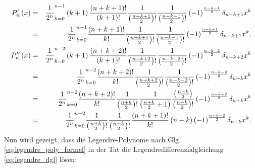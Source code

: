 \documentclass{book}
\let\sum\relax
\DeclareMathOperator*{\sum}{\raisebox{-3.5pt}{\scalebox{2}{\rotatebox{1}{{\bask Σ}}}}}
\begin{document}
\begin{eqnarray}
P_n'\left(x\right) & = & \frac{1}{2^n}\sum_{k = 0}^{n - 1}\left(k + 1\right)\frac{\left(n + k + 1\right)!}{\left(k + 1\right)!}\frac{1}{\left(\frac{n + k + 1}{2}\right)!}\frac{1}{\left(\frac{n - k - 1}{2}\right)!}\left(-1\right)^{\frac{n - k - 1}{2}}\delta_{n + k + 1}x^k\nonumber\\
& = & \frac{1}{2^n}\sum_{k = 0}^{n - 1}\frac{\left(n + k + 1\right)!}{k!}\frac{1}{\left(\frac{n + k + 1}{2}\right)!}\frac{1}{\left(\frac{n - k - 1}{2}\right)!}\left(-1\right)^{\frac{n - k - 1}{2}}\delta_{n + k + 1}x^k,\\
P_n''\left(x\right) & = & \frac{1}{2^n}\sum_{k = 0}^{n - 2}\left(k + 1\right)\frac{\left(n + k + 2\right)!}{\left(k + 1\right)!}\frac{1}{\left(\frac{n + k + 2}{2}\right)!}\frac{1}{\left(\frac{n - k - 2}{2}\right)!}\left(-1\right)^{\frac{n - k - 2}{2}}\delta_{n + k + 2}x^k\nonumber\\
& = & \frac{1}{2^n}\sum_{k = 0}^{n - 2}\frac{\left(n + k + 2\right)!}{k!}\frac{1}{\left(\frac{n + k + 2}{2}\right)!}\frac{1}{\left(\frac{n - k - 2}{2}\right)!}\left(-1\right)^{\frac{n - k - 2}{2}}\delta_{n + k}x^k\nonumber\\
& = & \frac{1}{2^n}\sum_{k = 0}^{n - 2}\frac{\left(n + k + 2\right)!}{k!}\frac{1}{\left(\frac{n + k}{2}\right)!}\frac{1}{\left(\frac{n + k}{2} + 1\right)}\frac{\left(\frac{n - k}{2}\right)}{\left(\frac{n - k}{2}\right)!}\left(-1\right)^{\frac{n - k - 2}{2}}\delta_{n + k}x^k\nonumber\\
& = & \frac{1}{2^n}\sum_{k = 0}^{n - 2}\frac{1}{\left(\frac{n + k}{2}\right)!}\frac{1}{\left(\frac{n - k}{2}\right)!}\frac{\left(n + k + 1\right)!}{k!}\left(n - k\right)\left(-1\right)^{\frac{n - k - 2}{2}}\delta_{n + k}x^k.
\end{eqnarray}
%
Nun wird gezeigt, dass die Legendre-Polynome nach Glg. \eqref{eq:legendre_poly_formel} in der Tat die Legendredifferenzialgleichung \eqref{eq:legendre_dgl} lösen:
%
\end{document}

